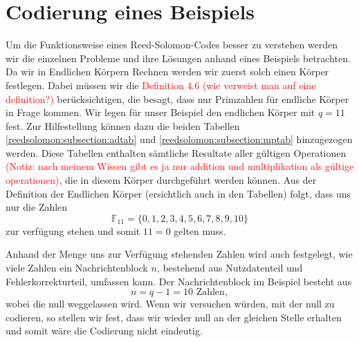 %
%
%
\section{Codierung eines Beispiels
\label{reedsolomon:section:codebsp}}

Um die Funktionsweise eines Reed-Solomon-Codes besser zu verstehen werden wir die einzelnen Probleme und ihre Lösungen anhand eines Beispiels betrachten.
Da wir in Endlichen Körpern Rechnen werden wir zuerst solch einen Körper festlegen. Dabei müssen wir die \textcolor{red}{Definition 4.6 (wie verweist man auf eine definition?)} berücksichtigen, die besagt, dass nur Primzahlen für endliche Körper in Frage kommen.
Wir legen für unser Beispiel den endlichen Körper mit $q = 11$ fest.
Zur Hilfestellung können dazu die beiden Tabellen \ref{reedsolomon:subsection:adtab} und
\ref{reedsolomon:subsection:mptab} hinzugezogen werden. Diese Tabellen enthalten sämtliche Resultate aller gültigen Operationen \textcolor{red}{(Notiz: nach meinem Wissen gibt es ja nur addition und multiplikation als gültige operationen)}, die in diesem Körper durchgeführt werden können.
Aus der Definition der Endlichen Körper (ersichtlich auch in den Tabellen) folgt, dass uns nur die Zahlen \[\mathbb{F}_{11} = \{0,1,2,3,4,5,6,7,8,9,10\}\] zur verfügung stehen und somit $11 = 0$ gelten muss.


%
%

Anhand der Menge uns zur Verfügung stehenden Zahlen wird auch festgelegt, wie viele Zahlen ein Nachrichtenblock $n$, bestehend aus Nutzdatenteil und Fehlerkorrekturteil, umfassen kann.
Der Nachrichtenblock im Beispiel besteht aus
\[
n = q - 1 = 10 \text{ Zahlen},
\]
wobei die null weggelassen wird. Wenn wir versuchen würden, mit der null zu codieren, so stellen wir fest, dass wir wieder null an der gleichen Stelle erhalten und somit wäre die Codierung nicht eindeutig.


